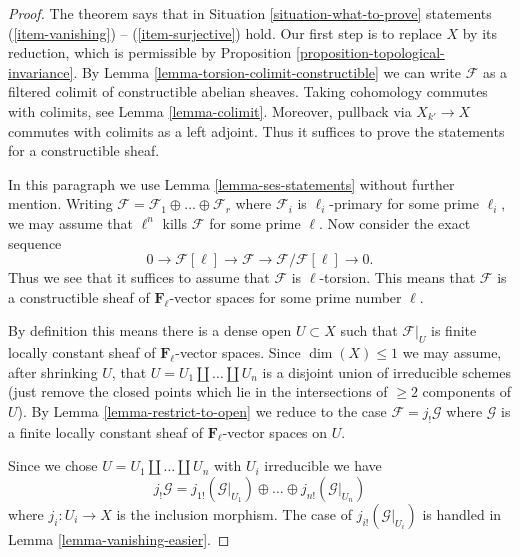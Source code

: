 \begin{proof}
The theorem says that in Situation \ref{situation-what-to-prove}
statements (\ref{item-vanishing}) -- (\ref{item-surjective}) hold.
Our first step is to replace $X$ by its reduction, which is permissible
by Proposition \ref{proposition-topological-invariance}.
By Lemma \ref{lemma-torsion-colimit-constructible} we can write
$\mathcal{F}$ as a filtered colimit of constructible abelian sheaves.
Taking cohomology commutes with colimits, see Lemma \ref{lemma-colimit}.
Moreover, pullback via $X_{k'} \to X$ commutes with colimits as a left
adjoint. Thus it suffices to prove the statements for a constructible sheaf.

\medskip\noindent
In this paragraph we use Lemma \ref{lemma-ses-statements} without further
mention. Writing
$\mathcal{F} = \mathcal{F}_1 \oplus \ldots \oplus \mathcal{F}_r$
where $\mathcal{F}_i$ is $\ell_i$-primary for some prime $\ell_i$, we may
assume that $\ell^n$ kills $\mathcal{F}$ for some prime $\ell$. Now consider
the exact sequence
$$
0 \to \mathcal{F}[\ell] \to \mathcal{F} \to \mathcal{F}/\mathcal{F}[\ell] \to 0.
$$
Thus we see that it suffices to assume that $\mathcal{F}$ is $\ell$-torsion.
This means that $\mathcal{F}$ is a constructible sheaf of
$\mathbf{F}_\ell$-vector spaces for some prime number $\ell$.

\medskip\noindent
By definition this means there is a dense open $U \subset X$
such that $\mathcal{F}|_U$ is finite locally constant sheaf of
$\mathbf{F}_\ell$-vector spaces. Since $\dim(X) \leq 1$ we may
assume, after shrinking $U$, that $U = U_1 \amalg \ldots \amalg U_n$
is a disjoint union of irreducible schemes (just remove the closed
points which lie in the intersections of $\geq 2$ components of $U$).
By Lemma \ref{lemma-restrict-to-open} we reduce to the case
$\mathcal{F} = j_!\mathcal{G}$ where $\mathcal{G}$ is a finite
locally constant sheaf of $\mathbf{F}_\ell$-vector spaces on $U$.

\medskip\noindent
Since we chose $U = U_1 \amalg \ldots \amalg U_n$ with $U_i$ irreducible
we have
$$
j_!\mathcal{G} =
j_{1!}(\mathcal{G}|_{U_1}) \oplus \ldots \oplus
j_{n!}(\mathcal{G}|_{U_n})
$$
where $j_i : U_i \to X$ is the inclusion morphism.
The case of $j_{i!}(\mathcal{G}|_{U_i})$ is handled in
Lemma \ref{lemma-vanishing-easier}.
\end{proof}
